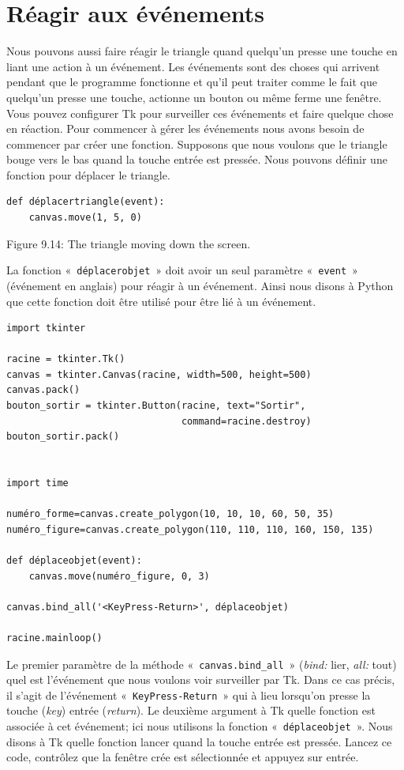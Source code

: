 \section{Réagir aux événements}
Nous pouvons aussi faire réagir le triangle quand quelqu'un presse une touche en liant une action à un événement. Les événements sont des choses qui arrivent pendant que le programme fonctionne et qu'il peut traiter comme le fait que quelqu'un presse une touche, actionne un bouton ou même ferme une fenêtre. Vous pouvez configurer Tk pour surveiller ces événements et faire quelque chose en réaction. Pour commencer à gérer les événements nous avons besoin de commencer par créer une fonction. Supposons que nous voulons que le triangle bouge vers le bas quand la touche entrée est pressée. Nous pouvons définir une fonction pour déplacer le triangle.
\begin{Verbatim}[frame=single,rulecolor=\color{gray}, label=ne pas taper]
def déplacertriangle(event):
    canvas.move(1, 5, 0)
\end{Verbatim}


Figure 9.14: The triangle moving down the screen.


La fonction « \texttt{déplacerobjet} » doit avoir un seul paramètre « \texttt{event} » (événement en anglais) pour réagir à un événement. Ainsi nous disons à Python que cette fonction doit être utilisé pour être lié à un événement.


\begin{Verbatim}[frame=single,rulecolor=\color{mbleu}, label=à taper]
import tkinter

racine = tkinter.Tk()
canvas = tkinter.Canvas(racine, width=500, height=500)
canvas.pack()
bouton_sortir = tkinter.Button(racine, text="Sortir",
                               command=racine.destroy)
bouton_sortir.pack()


import time

numéro_forme=canvas.create_polygon(10, 10, 10, 60, 50, 35)
numéro_figure=canvas.create_polygon(110, 110, 110, 160, 150, 135)

def déplaceobjet(event):
    canvas.move(numéro_figure, 0, 3)

canvas.bind_all('<KeyPress-Return>', déplaceobjet)

racine.mainloop()
\end{Verbatim}

Le premier paramètre de la méthode « \texttt{canvas.bind\_all} » (\emph{bind:} lier, \emph{all:} tout) quel est l'événement que nous voulons voir surveiller par Tk. Dans ce cas précis, il s'agit de l'événement « \texttt{KeyPress-Return} » qui à lieu lorsqu'on presse la touche (\emph{key}) entrée (\emph{return}). Le deuxième argument à Tk quelle fonction est associée à cet événement; ici nous utilisons la fonction  « \texttt{déplaceobjet} ». Nous disons à Tk quelle fonction lancer quand la touche entrée est pressée. Lancez ce code, contrôlez que la fenêtre crée est sélectionnée et appuyez sur entrée.

